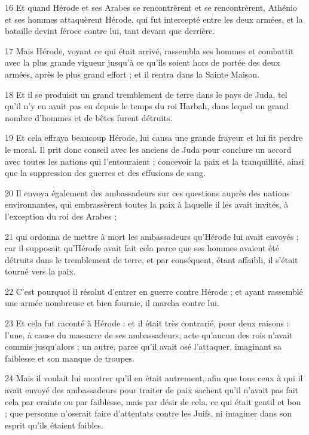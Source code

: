 \par 16 Et quand Hérode et ses Arabes se rencontrèrent et se rencontrèrent, Athénio et ses hommes attaquèrent Hérode, qui fut intercepté entre les deux armées, et la bataille devint féroce contre lui, tant devant que derrière.

\par 17 Mais Hérode, voyant ce qui était arrivé, rassembla ses hommes et combattit avec la plus grande vigueur jusqu'à ce qu'ils soient hors de portée des deux armées, après le plus grand effort ; et il rentra dans la Sainte Maison.

\par 18 Et il se produisit un grand tremblement de terre dans le pays de Juda, tel qu'il n'y en avait pas eu depuis le temps du roi Harbah, dans lequel un grand nombre d'hommes et de bêtes furent détruits.

\par 19 Et cela effraya beaucoup Hérode, lui causa une grande frayeur et lui fit perdre le moral. Il prit donc conseil avec les anciens de Juda pour conclure un accord avec toutes les nations qui l'entouraient ; concevoir la paix et la tranquillité, ainsi que la suppression des guerres et des effusions de sang.

\par 20 Il envoya également des ambassadeurs sur ces questions auprès des nations environnantes, qui embrassèrent toutes la paix à laquelle il les avait invités, à l'exception du roi des Arabes ;

\par 21 qui ordonna de mettre à mort les ambassadeurs qu'Hérode lui avait envoyés ; car il supposait qu'Hérode avait fait cela parce que ses hommes avaient été détruits dans le tremblement de terre, et par conséquent, étant affaibli, il s'était tourné vers la paix.

\par 22 C'est pourquoi il résolut d'entrer en guerre contre Hérode ; et ayant rassemblé une armée nombreuse et bien fournie, il marcha contre lui.

\par 23 Et cela fut raconté à Hérode : et il était très contrarié, pour deux raisons : l'une, à cause du massacre de ses ambassadeurs, acte qu'aucun des rois n'avait commis jusqu'alors ; un autre, parce qu'il avait osé l'attaquer, imaginant sa faiblesse et son manque de troupes.

\par 24 Mais il voulait lui montrer qu'il en était autrement, afin que tous ceux à qui il avait envoyé des ambassadeurs pour traiter de paix sachent qu'il n'avait pas fait cela par crainte ou par faiblesse, mais par désir de cela. ce qui était gentil et bon ; que personne n'oserait faire d'attentats contre les Juifs, ni imaginer dans son esprit qu'ils étaient faibles.

